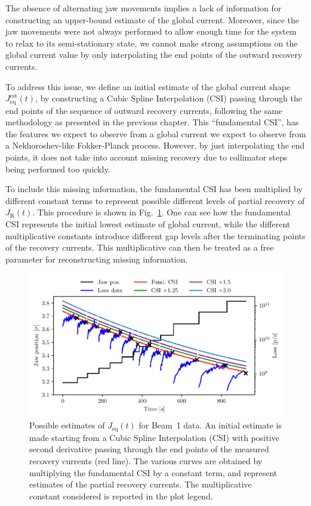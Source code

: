 The absence of alternating jaw movements implies a lack of information for constructing an upper-bound estimate of the global current. Moreover, since the jaw movements were not always performed to allow enough time for the system to relax to its semi-stationary state, we cannot make strong assumptions on the global current value by only interpolating the end points of the outward recovery currents. 

To address this issue, we define an initial estimate of the global current shape $J_\text{eq}^{\text{est}}(t)$, by constructing a Cubic Spline Interpolation (CSI) passing through the end points of the sequence of outward recovery currents, following the same methodology as presented in the previous chapter. This ``fundamental CSI'', has the features we expect to observe from a global current we expect to observe from a Nekhoroshev-like Fokker-Planck process. However, by just interpolating the end points, it does not take into account missing recovery due to collimator steps being performed too quickly.

To include this missing information, the fundamental CSI has been multiplied by different constant terms to represent possible different levels of partial recovery of $J_\mathrm{R}(t)$. This procedure is shown in Fig.~\ref{fig:second}. One can see how the fundamental CSI represents the initial lowest estimate of global current, while the different multiplicative constants introduce different gap levels after the terminating points of the recovery currents. This multiplicative can then be treated as a free parameter for reconstructing missing information.

%
\begin{figure}[hpt]
    \centering
    \includegraphics[trim={0 2.5mm 0 3mm}, clip, width=\columnwidth]{5_Diffusion_measurement_LHC/figs/second_bis.pdf}
    \caption{Possible estimates of $J_\mathrm{eq}(t)$ for Beam~1 data. An initial estimate is made starting from a Cubic Spline Interpolation (CSI) with positive second derivative passing through the end points of the measured recovery currents (red line). The various curves are obtained by multiplying the fundamental CSI by a constant term, and represent estimates of the partial recovery currents. The multiplicative constant considered is reported in the plot legend.}
    \label{fig:second}
\end{figure}
%

